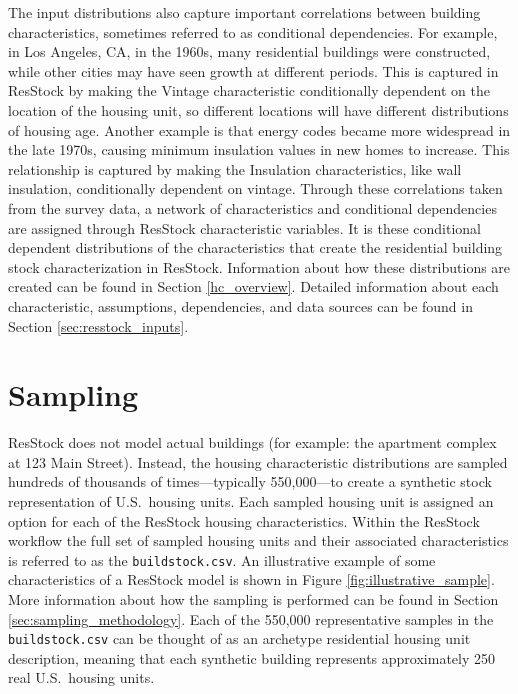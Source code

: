 
The input distributions also capture important correlations between building characteristics, sometimes referred to as conditional dependencies. For example, in Los Angeles, CA, in the 1960s, many residential buildings were constructed, while other cities may have seen growth at different periods. This is captured in ResStock by making the Vintage characteristic conditionally dependent on the location of the housing unit, so different locations will have different distributions of housing age. Another example is that energy codes became more widespread in the late 1970s, causing minimum insulation values in new homes to increase. This relationship is captured by making the Insulation characteristics, like wall insulation, conditionally dependent on vintage. Through these correlations taken from the survey data, a network of characteristics and conditional dependencies are assigned through ResStock characteristic variables. It is these conditional dependent distributions of the characteristics that create the residential building stock characterization in ResStock. Information about how these distributions are created can be found in Section \ref{hc_overview}. Detailed information about each characteristic, assumptions, dependencies, and data sources can be found in Section \ref{sec:resstock_inputs}.

\section{Sampling}
ResStock does not model actual buildings (for example: the apartment complex at 123 Main Street). Instead, the housing characteristic distributions are sampled hundreds of thousands of times---typically 550,000---to create a synthetic stock representation of U.S.~housing units. Each sampled housing unit is assigned an option for each of the ResStock housing characteristics. Within the ResStock workflow the full set of sampled housing units and their associated characteristics is referred to as the \texttt{buildstock.csv}. An illustrative example of some characteristics of a ResStock model is shown in Figure \ref{fig:illustrative_sample}. More information about how the sampling is performed can be found in Section \ref{sec:sampling_methodology}. Each of the 550,000 representative samples in the \texttt{buildstock.csv} can be thought of as an archetype residential housing unit description, meaning that each synthetic building represents approximately 250 real U.S.~housing units.

